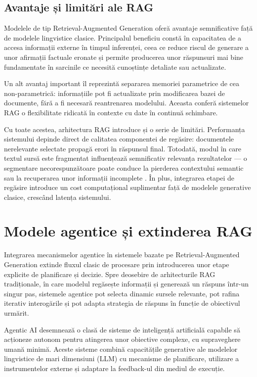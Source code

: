 \documentclass[12pt, a4paper, oneside, romanian]{teza-upb}
\begin{document}
\subsection{Avantaje și limitări ale RAG}

Modelele de tip Retrieval-Augmented Generation oferă avantaje semnificative față de
modelele lingvistice clasice. Principalul beneficiu constă în capacitatea de a accesa
informații externe în timpul inferenței, ceea ce reduce riscul de generare a unor
afirmații factuale eronate și permite producerea unor răspunsuri mai bine fundamentate
în sarcinile ce necesită cunoștințe detaliate sau actualizate.

Un alt avantaj important îl reprezintă separarea memoriei parametrice de cea
non-parametrică: informațiile pot fi actualizate prin modificarea bazei de documente,
fără a fi necesară reantrenarea modelului. Aceasta conferă sistemelor RAG o
flexibilitate ridicată în contexte cu date în continuă schimbare. \cite{lewis2020retrieval}

Cu toate acestea, arhitectura RAG introduce și o serie de limitări. Performanța
sistemului depinde direct de calitatea componentei de regăsire: documentele
nerelevante selectate propagă erori în răspunsul final. Totodată, modul în care
textul sursă este fragmentat influențează semnificativ relevanța rezultatelor —
o segmentare necorespunzătoare poate conduce la pierderea contextului semantic
sau la recuperarea unor informații incomplete \cite{gao2023retrieval}. În plus,
integrarea etapei de regăsire introduce un cost computațional suplimentar față
de modelele generative clasice, crescând latența sistemului.

\section{Modele agentice și extinderea RAG}

Integrarea mecanismelor agentice în sistemele bazate pe Retrieval-Augmented Generation 
extinde fluxul clasic de procesare prin introducerea unor etape explicite de planificare 
și decizie. Spre deosebire de arhitecturile RAG tradiționale, în care modelul regăsește 
informații și generează un răspuns într-un singur pas, sistemele agentice pot selecta 
dinamic sursele relevante, pot rafina iterativ interogările și pot adapta strategia de 
răspuns în funcție de obiectivul urmărit.

Agentic AI desemnează o clasă de sisteme de inteligență artificială capabile să acționeze 
autonom pentru atingerea unor obiective complexe, cu supraveghere umană minimă. Aceste 
sisteme combină capacitățile generative ale modelelor lingvistice de mari dimensiuni (LLM) 
cu mecanisme de planificare, utilizare a instrumentelor externe și adaptare la feedback-ul 
din mediul de execuție. \cite{ibm_agentic}
\end{document}
